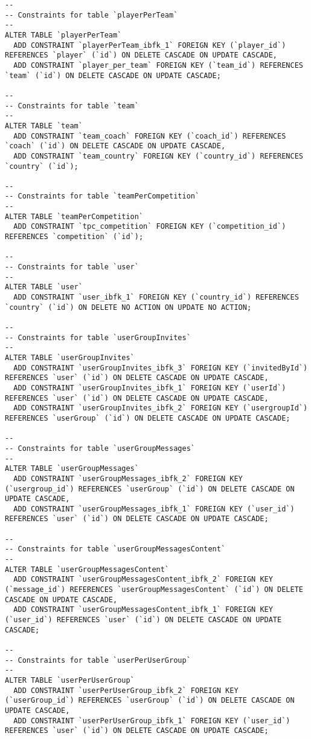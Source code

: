 \documentclass[11pt, a4paper]{article}
\begin{document}
\begin{lstlisting}
--
-- Constraints for table `playerPerTeam`
--
ALTER TABLE `playerPerTeam`
  ADD CONSTRAINT `playerPerTeam_ibfk_1` FOREIGN KEY (`player_id`) REFERENCES `player` (`id`) ON DELETE CASCADE ON UPDATE CASCADE,
  ADD CONSTRAINT `player_per_team` FOREIGN KEY (`team_id`) REFERENCES `team` (`id`) ON DELETE CASCADE ON UPDATE CASCADE;

--
-- Constraints for table `team`
--
ALTER TABLE `team`
  ADD CONSTRAINT `team_coach` FOREIGN KEY (`coach_id`) REFERENCES `coach` (`id`) ON DELETE CASCADE ON UPDATE CASCADE,
  ADD CONSTRAINT `team_country` FOREIGN KEY (`country_id`) REFERENCES `country` (`id`);

--
-- Constraints for table `teamPerCompetition`
--
ALTER TABLE `teamPerCompetition`
  ADD CONSTRAINT `tpc_competition` FOREIGN KEY (`competition_id`) REFERENCES `competition` (`id`);

--
-- Constraints for table `user`
--
ALTER TABLE `user`
  ADD CONSTRAINT `user_ibfk_1` FOREIGN KEY (`country_id`) REFERENCES `country` (`id`) ON DELETE NO ACTION ON UPDATE NO ACTION;

--
-- Constraints for table `userGroupInvites`
--
ALTER TABLE `userGroupInvites`
  ADD CONSTRAINT `userGroupInvites_ibfk_3` FOREIGN KEY (`invitedById`) REFERENCES `user` (`id`) ON DELETE CASCADE ON UPDATE CASCADE,
  ADD CONSTRAINT `userGroupInvites_ibfk_1` FOREIGN KEY (`userId`) REFERENCES `user` (`id`) ON DELETE CASCADE ON UPDATE CASCADE,
  ADD CONSTRAINT `userGroupInvites_ibfk_2` FOREIGN KEY (`usergroupId`) REFERENCES `userGroup` (`id`) ON DELETE CASCADE ON UPDATE CASCADE;

--
-- Constraints for table `userGroupMessages`
--
ALTER TABLE `userGroupMessages`
  ADD CONSTRAINT `userGroupMessages_ibfk_2` FOREIGN KEY (`usergroup_id`) REFERENCES `userGroup` (`id`) ON DELETE CASCADE ON UPDATE CASCADE,
  ADD CONSTRAINT `userGroupMessages_ibfk_1` FOREIGN KEY (`user_id`) REFERENCES `user` (`id`) ON DELETE CASCADE ON UPDATE CASCADE;

--
-- Constraints for table `userGroupMessagesContent`
--
ALTER TABLE `userGroupMessagesContent`
  ADD CONSTRAINT `userGroupMessagesContent_ibfk_2` FOREIGN KEY (`message_id`) REFERENCES `userGroupMessagesContent` (`id`) ON DELETE CASCADE ON UPDATE CASCADE,
  ADD CONSTRAINT `userGroupMessagesContent_ibfk_1` FOREIGN KEY (`user_id`) REFERENCES `user` (`id`) ON DELETE CASCADE ON UPDATE CASCADE;

--
-- Constraints for table `userPerUserGroup`
--
ALTER TABLE `userPerUserGroup`
  ADD CONSTRAINT `userPerUserGroup_ibfk_2` FOREIGN KEY (`userGroup_id`) REFERENCES `userGroup` (`id`) ON DELETE CASCADE ON UPDATE CASCADE,
  ADD CONSTRAINT `userPerUserGroup_ibfk_1` FOREIGN KEY (`user_id`) REFERENCES `user` (`id`) ON DELETE CASCADE ON UPDATE CASCADE;
\end{lstlisting}
\end{document}
